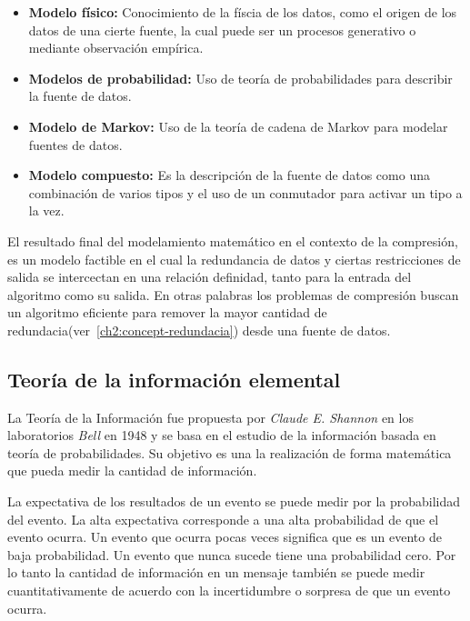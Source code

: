 \begin{itemize}
	\menorEspacioItemize
	\item \textbf{Modelo físico:} Conocimiento de la físcia de los datos, como el origen de los datos de una cierte fuente, la cual puede ser un procesos generativo o mediante observación empírica.

	\item \textbf{Modelos de probabilidad:} Uso de teoría de probabilidades para describir la fuente de datos.


	\item \textbf{Modelo de Markov:} Uso de la teoría de cadena de Markov para modelar fuentes de datos.


	\item \textbf{Modelo compuesto:} Es la descripción de la fuente de datos como una combinación de varios tipos y el uso de un conmutador para activar un tipo a la vez.
\end{itemize}

El resultado final del modelamiento matemático en el contexto de la compresión, es un modelo factible en el cual la redundancia de datos y ciertas restricciones de salida se intercectan en una relación definidad, tanto para la entrada del algoritmo como su salida. En otras palabras los problemas de compresión  buscan un algoritmo eficiente para remover la mayor cantidad de redundacia(ver~\ref{ch2:concept-redundacia}) desde una fuente de datos.

\uncm
 


\subsection{Teoría de la información elemental}


La Teoría de la Información fue propuesta por \emph{Claude E. Shannon} en los laboratorios \emph{Bell} en 1948 y se basa en el estudio de la información basada en teoría de probabilidades. Su objetivo es una la realización de forma matemática que pueda medir la cantidad de información.

La expectativa de los resultados de un evento se puede medir por la probabilidad del evento. La alta expectativa corresponde a una alta probabilidad de que el evento ocurra. Un evento que ocurra pocas veces significa que es un evento de baja probabilidad. Un evento que nunca sucede tiene una probabilidad cero. Por lo tanto la cantidad de información en un mensaje también se puede medir cuantitativamente de acuerdo con la incertidumbre o sorpresa de que un evento ocurra.


